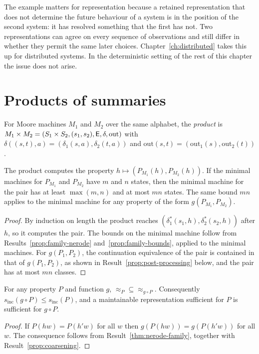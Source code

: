 The example matters for representation because a retained representation that does not determine the future behaviour of a system is in the position of the second system: it has resolved something that the first has not. Two representations can agree on every sequence of observations and still differ in whether they permit the same later choices. Chapter~\ref{ch:distributed} takes this up for distributed systems. In the deterministic setting of the rest of this chapter the issue does not arise.

\section{Products of summaries}

\begin{definition}\label{def:product}
For Moore machines $M_1$ and $M_2$ over the same alphabet, the \emph{product} is $M_1\times M_2=(S_1\times S_2,(s_1,s_2),\mathsf{E},\delta,\mathrm{out})$ with $\delta((s,t),a)=(\delta_1(s,a),\delta_2(t,a))$ and $\mathrm{out}(s,t)=(\mathrm{out}_1(s),\mathrm{out}_2(t))$.
\end{definition}

\begin{established}\label{prop:product}
The product computes the property $h\mapsto(P_{M_1}(h),P_{M_2}(h))$. If the minimal machines for $P_{M_1}$ and $P_{M_2}$ have $m$ and $n$ states, then the minimal machine for the pair has at least $\max(m,n)$ and at most $mn$ states. The same bound $mn$ applies to the minimal machine for any property of the form $g(P_{M_1},P_{M_2})$.
\end{established}
\begin{proof}
By induction on length the product reaches $(\delta_1^{*}(s_1,h),\delta_2^{*}(s_2,h))$ after $h$, so it computes the pair. The bounds on the minimal machine follow from Results~\ref{prop:family-nerode} and~\ref{prop:family-bounds}, applied to the minimal machines. For $g(P_1,P_2)$, the continuation equivalence of the pair is contained in that of $g(P_1,P_2)$, as shown in Result~\ref{prop:post-processing} below, and the pair has at most $mn$ classes.
\end{proof}

\begin{established}\label{prop:post-processing}
For any property $P$ and function $g$, ${\approx_P}\subseteq{\approx_{g\circ P}}$. Consequently $s_{\mathrm{inc}}(g\circ P)\le s_{\mathrm{inc}}(P)$, and a maintainable representation sufficient for $P$ is sufficient for $g\circ P$.
\end{established}
\begin{proof}
If $P(hw)=P(h'w)$ for all $w$ then $g(P(hw))=g(P(h'w))$ for all $w$. The consequence follows from Result~\ref{thm:nerode-family}, together with Result~\ref{prop:coarsening}.
\end{proof}

